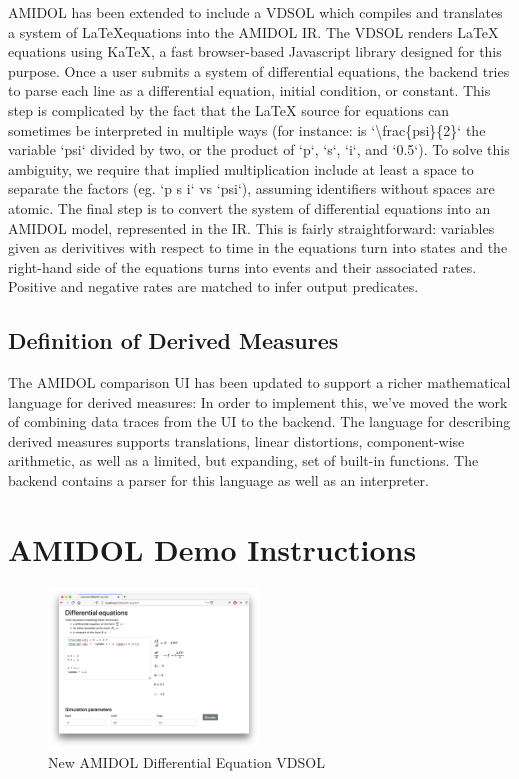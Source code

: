 \documentclass[12pt]{galois-whitepaper}
\begin{document}
AMIDOL has been extended to include a VDSOL which compiles and
translates a system of \LaTeX equations into the AMIDOL IR. The VDSOL renders LaTeX
equations using KaTeX, a fast browser-based Javascript library
designed for this purpose. Once a user submits a system of
differential equations, the backend tries to parse each line as a
differential equation, initial condition, or constant. This step is
complicated by the fact that the LaTeX source for equations can
sometimes be interpreted in multiple ways (for instance: is
`\textbackslash frac\{psi\}\{2\}` the variable `psi` divided by two, or
the product of `p`, `s`, `i`, and `0.5`). To solve this ambiguity, we
require that implied multiplication include at least a space to
separate the factors (eg. `p s i` vs `psi`), assuming identifiers
without spaces are atomic. The final step is to
convert the system of differential equations into an AMIDOL
model, represented in the IR. This is fairly straightforward:
variables given as derivitives with respect to time in the equations turn
into states and the right-hand side of the equations turns into
events and their associated rates.  Positive and negative rates are
matched to infer output predicates.

\subsection{Definition of Derived Measures}

The AMIDOL comparison UI has been updated
to support a richer mathematical language
for derived measures:  In order to implement this, we’ve moved the
work of combining data traces from the UI to the backend. The language
for describing derived measures supports translations, linear
distortions, component-wise arithmetic, as well as a limited, but
expanding, set of built-in functions. The backend contains a parser for this language as
well as an interpreter.

\section{AMIDOL Demo Instructions}

\begin{figure}
  \centering
  \includegraphics[width=0.5\textwidth]{figs/LaTeX_VDSOL.png}
  \caption{New AMIDOL Differential Equation VDSOL}
  \label{Fig:DiffEq}
\end{figure}
\end{document}
